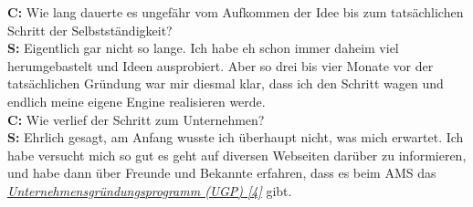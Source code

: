 \textbf{C:} Wie lang dauerte es ungefähr vom Aufkommen der Idee bis zum tatsächlichen Schritt der Selbstständigkeit? \\
\textbf{S:} Eigentlich gar nicht so lange. Ich habe eh schon immer daheim viel herumgebastelt und Ideen ausprobiert. Aber so drei bis vier Monate vor der tatsächlichen Gründung war mir diesmal klar, dass ich den Schritt wagen und endlich meine eigene Engine realisieren werde.\\
\textbf{C:} Wie verlief der Schritt zum Unternehmen? \\
\textbf{S:} Ehrlich gesagt, am Anfang wusste ich überhaupt nicht, was mich erwartet. Ich habe versucht mich so gut es geht auf diversen Webseiten darüber zu informieren, und habe dann über Freunde und Bekannte erfahren, dass es beim AMS das \href{http://www.ams.at/sfa/14081_10435.html}{\textit{Unternehmensgründungsprogramm (UGP) [4]}} gibt.

